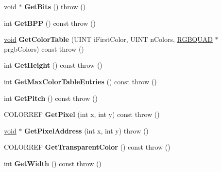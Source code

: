 \begin{DoxyCompactItemize}
\hyperlink{interfacevoid}{void} $\ast$ {\bfseries Get\+Bits} ()  throw ()
\item 
\mbox{\label{class_a_t_l_1_1_c_image_a15c6202e3017d27c5e462994bd90d0ea}} 
int {\bfseries Get\+B\+PP} () const  throw ()
\item 
\mbox{\label{class_a_t_l_1_1_c_image_a7f6d922199a09c5cda81ce9073293465}} 
\hyperlink{interfacevoid}{void} {\bfseries Get\+Color\+Table} (U\+I\+NT i\+First\+Color, U\+I\+NT n\+Colors, \hyperlink{structtag_r_g_b_q_u_a_d}{R\+G\+B\+Q\+U\+AD} $\ast$prgb\+Colors) const  throw ()
\item 
\mbox{\label{class_a_t_l_1_1_c_image_ab957bac092c0d334b2e0752afb32abb7}} 
int {\bfseries Get\+Height} () const  throw ()
\item 
\mbox{\label{class_a_t_l_1_1_c_image_a3d81b7f050bee0855510bcf8dfc0bc21}} 
int {\bfseries Get\+Max\+Color\+Table\+Entries} () const  throw ()
\item 
\mbox{\label{class_a_t_l_1_1_c_image_a325edaad7234df4a36a13e69096986c9}} 
int {\bfseries Get\+Pitch} () const  throw ()
\item 
\mbox{\label{class_a_t_l_1_1_c_image_ae5e82d9e2d0aaf929ac1f3f98b4f537d}} 
C\+O\+L\+O\+R\+R\+EF {\bfseries Get\+Pixel} (int x, int y) const  throw ()
\item 
\mbox{\label{class_a_t_l_1_1_c_image_ad6d3470cd25c66a1e1c81ff4858099a4}} 
\hyperlink{interfacevoid}{void} $\ast$ {\bfseries Get\+Pixel\+Address} (int x, int y)  throw ()
\item 
\mbox{\label{class_a_t_l_1_1_c_image_ab70c358b6d12aa864710c62a5e14fa0d}} 
C\+O\+L\+O\+R\+R\+EF {\bfseries Get\+Transparent\+Color} () const  throw ()
\item 
\mbox{\label{class_a_t_l_1_1_c_image_aabca79ffbdcae52f256d7672ece6dd1e}} 
int {\bfseries Get\+Width} () const  throw ()
\item 
\mbox{\label{class_a_t_l_1_1_c_image_abdc829c5c8fdca2b620b20de87899c73}} 

\end{DoxyCompactItemize}
